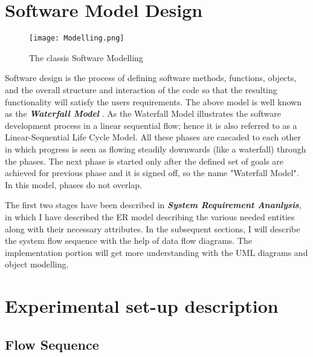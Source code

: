 \documentclass[12pt]{report}
\begin{document}
\section{Software Model Design}
\begin{figure}[!htb]
\texttt{[image: Modelling.png]}
\centering
\caption{The classis Software Modelling}

\end{figure}
Software design is the process of defining software methods, functions, objects, and the overall structure and interaction of the code so that the resulting functionality will satisfy the users requirements. The above model is well known as the \textbf{\textit{Waterfall Model} }. As the Waterfall Model illustrates the software development process in a linear sequential flow; hence it is also referred to as a Linear-Sequential Life Cycle Model. All these phases are cascaded to each other in which progress is seen as flowing steadily downwards (like a waterfall) through the phases. The next phase is started only after the defined set of goals are achieved for previous phase and it is signed off, so the name "Waterfall Model". In this model, phases do not overlap.\newline

The first two stages have been described in \textbf{\textit{System Requirement Ananlysis}}, in which I have described the ER model describing the various needed entities along with their necessary attributes. In the subsequent sections, I will describe the system flow sequence with the help of data flow diagrams. The implementation portion will get more understanding with the UML diagrams and object modelling.  \newpage
\section{Experimental set-up description}
\subsection{Flow Sequence}
\end{document}
